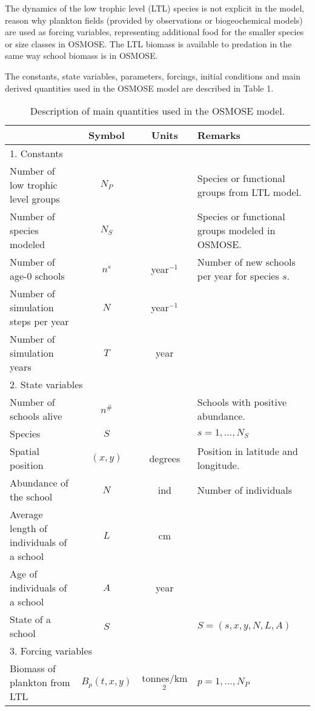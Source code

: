 \documentclass[10pt,a4paper]{article}
\begin{document}
The dynamics of the low trophic level (LTL) species is not explicit in the model, reason why plankton fields (provided by observations or biogeochemical models) are used as forcing variables, representing additional food for the smaller species or size classes in OSMOSE. The LTL biomass is available to predation in the same way school biomass is in OSMOSE.
     
The constants, state variables, parameters, forcings, initial conditions and main derived quantities used in the OSMOSE model are described in Table 1.

\begin{table}
\caption{Description of main quantities used in the OSMOSE model.}
\centering \small
\begin{tabular}{|l|c|c|p{4cm}|}
\hline & Symbol & Units & Remarks\\
\hline \multicolumn{4}{|l|}{1. Constants}\\
\hline Number of low trophic level groups & $N_P$ & &	Species or functional groups from LTL model.\\
\hline Number of species modeled & $N_S$ & & Species or functional groups modeled in OSMOSE.\\
\hline Number of age-0 schools & $n^s$ & year$^{-1}$ & Number of new schools per year for species $s$.\\
\hline Number of simulation steps per year	& $N$ &	year$^{-1}$ & \\
\hline Number of simulation years & $T$ & year &  \\
\hline \multicolumn{4}{|l|}{2. State variables}\\	
\hline Number of schools alive & $n^{\#}$ & & Schools with positive abundance. \\
\hline Species	& $S$ & & $s = 1, \ldots , N_S$\\
\hline Spatial position & 	$(x,y)$ & degrees & Position in latitude and longitude.\\
\hline Abundance of the school & $N$ & ind & Number of individuals \\
\hline Average length of individuals of a school & $L$ & cm & \\	
\hline Age of individuals of a school & $A$ & year & \\	
\hline State of a school & $S$ & & $S = (s, x, y, N, L, A)$ \\
\hline \multicolumn{4}{|l|}{3. Forcing variables}\\ 
\hline Biomass of plankton from LTL & $B_p(t,x,y)$	& tonnes/km$^2$ & $p = 1, \ldots, N_P$\\

\end{tabular}
\end{table}
\end{document}
